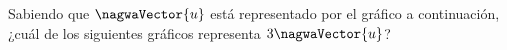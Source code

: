 \begin{question}\begin{instance}  \begin{mcq}[standalone=false]    \begin{stem}      Sabiendo que $\nagwaVector{u}$ está representado por el gráfico a continuación, ¿cuál de los siguientes gráficos representa $3\nagwaVector{u}$?\par      {}    \end{stem}    \begin{distractors}\end{distractors}                  \end{mcq}\end{instance}\end{question}